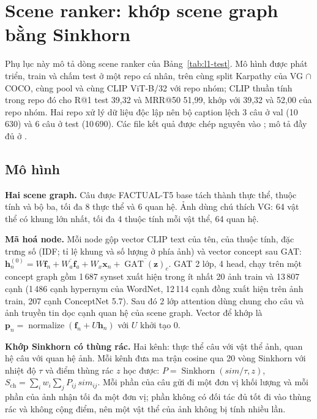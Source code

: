 \section{Scene ranker: khớp scene graph bằng Sinkhorn}\label{app:scene-ranker}

Phụ lục này mô tả dòng scene ranker của Bảng~\ref{tab:l1-test}. Mô hình được phát triển, train và chấm test ở một repo cá
nhân, trên cùng split Karpathy của VG $\cap$ COCO, cùng pool và cùng CLIP ViT-B/32 với repo nhóm; CLIP thuần tính trong repo
đó cho R@1 test 39,32 và MRR@50 51,99, khớp với 39,32 và 52,00 của repo nhóm. Hai repo xử lý dữ liệu độc lập nên bộ caption
lệch 3 câu ở val (10\,630) và 6 câu ở test (10\,690). Các file kết quả được chép nguyên vào
; mô tả đầy đủ ở .

\subsection{Mô hình}
\textbf{Hai scene graph.} Câu được FACTUAL-T5 base tách thành thực thể, thuộc tính và bộ ba, tối đa 8 thực thể và 6 quan hệ.
Ảnh dùng chú thích VG: 64 vật thể có khung lớn nhất, tối đa 4 thuộc tính mỗi vật thể, 64 quan hệ.

\textbf{Mã hoá node.} Mỗi node gộp vector CLIP text của tên, của thuộc tính, đặc trưng số (IDF; tỉ lệ khung và số lượng ở
phía ảnh) và vector concept sau GAT:
$\mathbf h^{(0)}_n = W \mathbf f_n + \overline{W_a \mathbf f_a} + W_x \mathbf x_n + \overline{\operatorname{GAT}(\mathbf z)_c}$.
GAT 2 lớp, 4 head, chạy trên một concept graph gồm 1\,687 synset xuất hiện trong ít nhất 20 ảnh train và 13\,807 cạnh (1\,486
cạnh hypernym của WordNet, 12\,114 cạnh đồng xuất hiện trên ảnh train, 207 cạnh ConceptNet 5.7). Sau đó 2 lớp attention dùng
chung cho câu và ảnh truyền tin dọc cạnh quan hệ của scene graph. Vector để khớp là
$\mathbf p_n = \operatorname{normalize}(\mathbf f_n + U \mathbf h_n)$ với $U$ khởi tạo 0.

\textbf{Khớp Sinkhorn có thùng rác.} Hai kênh: thực thể câu với vật thể ảnh, quan hệ câu với quan hệ ảnh. Mỗi kênh đưa ma
trận cosine qua 20 vòng Sinkhorn với nhiệt độ $\tau$ và điểm thùng rác $z$ học được:
$P = \operatorname{Sinkhorn}(\mathit{sim}/\tau, z)$, $S_{\text{ch}} = \sum_i w_i \sum_j P_{ij}\,\mathit{sim}_{ij}$. Mỗi phần của
câu gửi đi một đơn vị khối lượng và mỗi phần của ảnh nhận tối đa một đơn vị; phần không có đối tác đủ tốt đi vào thùng rác và
không cộng điểm, nên một vật thể của ảnh không bị tính nhiều lần.

